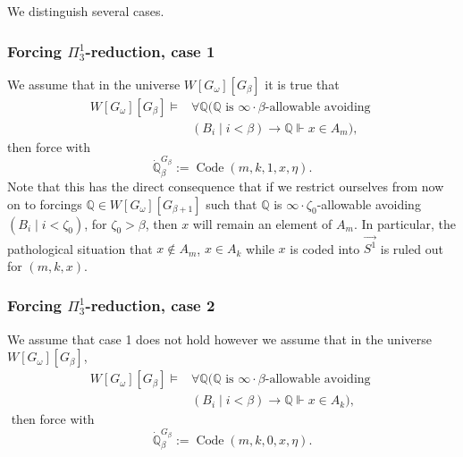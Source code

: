 \documentclass[a4paper,11pt]{article}
\newcommand{\forceP}{\mathbb{P}}
\newcommand{\forceQ}{\mathbb{Q}}
\begin{document}
   We distinguish several cases.

\subsubsection{Forcing \texorpdfstring{$\Pi^1_3$}{Pi13}-reduction, case 1} 
 We assume that in the universe $W[G_{\omega}] [G_{\beta}]$
it is true that 
 \begin{align*} 
W[G_{\omega}] [G_{\beta}] \models & \forall \forceQ (\forceQ \text{ is $\infty \cdot  \beta $-allowable avoiding }  \\& (B_i \mid i <\beta) \rightarrow \forceQ \Vdash x \in A_m),
\end{align*}
 then force with \[\dot{\forceQ}_{\beta}^{G_{\beta}} := \operatorname{Code} (m,k,1,x,\eta).\] Note that this has the direct consequence that if we restrict ourselves from now on to forcings $\forceQ \in W[G_{\omega}] [G_{\beta+1}]$ such that $ \forceQ$ is $\infty \cdot \zeta_0$-allowable avoiding $(B_i \mid i < \zeta_0)$, for $\zeta_0 >\beta$, then $x$ will remain an element of $A_m$. In particular, the pathological situation that $x \notin A_m$, $x \in A_k$ while $x$ is coded into $\vec{S^1}$ is ruled out for $(m,k,x)$.
    
\subsubsection{Forcing \texorpdfstring{$\Pi^1_3$}{Pi13}-reduction, case 2}
We assume that case 1 does not hold however we assume that  in the universe $W[G_{\omega}] [G_{\beta}]$,
\begin{align*} 
W[G_{\omega}] [G_{\beta}] \models & \forall \forceQ (\forceQ \text{ is $\infty \cdot \beta $-allowable avoiding }  \\& (B_i \mid i <\beta) \rightarrow \forceQ \Vdash x \in A_k),
\end{align*}    
    ﻿
    then force with \[ \dot{\forceQ}_{\beta}^{G_{\beta}}:=\operatorname{Code} (m,k,0,x,\eta).\]
\end{document}
